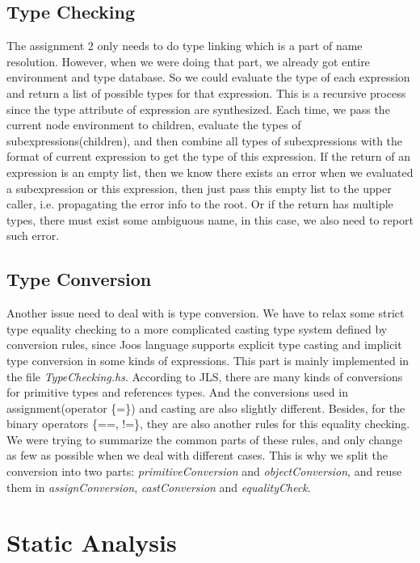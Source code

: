 \documentclass[12pt,letterpaper]{article}
\begin{document}
\subsection{Type Checking}

The assignment 2 only needs to do type linking which is a part of name resolution. However, when we were doing that part, we already got entire environment and type database.
So we could evaluate the type of each expression and return a list of possible types for that expression.
This is a recursive process since the type attribute of expression are synthesized.
Each time, we pass the current node environment to children, evaluate the types of subexpressions(children), and then combine all types of subexpressions with the format of current expression to get the type of this expression. 
If the return of an expression is an empty list, then we know there exists an error when we evaluated a subexpression or this expression, then just pass this empty list to the upper caller, i.e. propagating the error info to the root.
Or if the return has multiple types, there must exist some ambiguous name, in this case, we also need to report such error.

\subsection{Type Conversion}

Another issue need to deal with is type conversion.
We have to relax some strict type equality checking to a more complicated casting type system defined by conversion rules, since Joos language supports explicit type casting and implicit type conversion in some kinds of expressions.
This part is mainly implemented in the file \emph{TypeChecking.hs}.
According to JLS, there are many kinds of conversions for primitive types and references types.
And the conversions used in assignment(operator \{=\}) and casting are also slightly different.
Besides, for the binary operators \{==, !=\}, they are also another rules for this equality checking.
We were trying to summarize the common parts of these rules, and only change as few as possible when we deal with different cases.
This is why we split the conversion into two parts: \emph{primitiveConversion} and \emph{objectConversion}, and reuse them in \emph{assignConversion}, \emph{castConversion} and \emph{equalityCheck}.


\section{Static Analysis}
\end{document}
